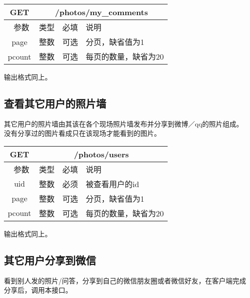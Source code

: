 \begin{table}[H]
   \begin{center}
\begin{tabular}{|c|c|c|p{12cm}|}
\hline
GET & \multicolumn{3}{|c|}{/photos/my\_comments} \\
\hline\hline
 \  参数  & 类型 & 必填 &  说明  \\
\hline
 page  & 整数 & 可选 & 分页，缺省值为1\\ 
 \hline
 pcount  & 整数 & 可选 & 每页的数量，缺省为20\\ 
\hline
\end{tabular}
   \end{center}
\end{table}

输出格式同上。


\subsection{查看其它用户的照片墙}
其它用户的照片墙由其该在各个现场照片墙发布并分享到微博／qq的照片组成。没有分享过的图片看成只在该现场才能看到的图片。

\begin{table}[H]
   \begin{center}
\begin{tabular}{|c|c|c|p{12cm}|}
\hline
GET & \multicolumn{3}{|c|}{/photos/users} \\
\hline\hline
 \  参数  & 类型 & 必填 &  说明  \\
 \hline
 uid  & 整数 & 必须 & 被查看用户的id\\ 
\hline
 page  & 整数 & 可选 & 分页，缺省值为1\\ 
 \hline
 pcount  & 整数 & 可选 & 每页的数量，缺省为20\\ 
\hline
\end{tabular}
   \end{center}
\end{table}

输出格式同上。



\subsection{其它用户分享到微信}
看到别人发的照片/问答，分享到自己的微信朋友圈或者微信好友，在客户端完成分享后，调用本接口。

